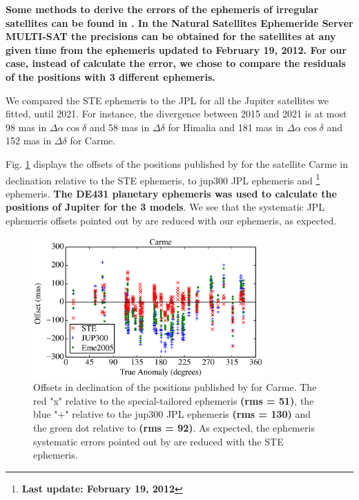 \documentclass[useAMS,usenatbib]{mn2e}
\begin{document}
\textbf{Some methods to derive the errors of the ephemeris of irregular satellites can be found in \cite{Emelyanov2010}. In the Natural Satellites Ephemeride Server MULTI-SAT \citep{Emelyanov2008} the precisions can be obtained for the satellites at any given time from the \cite{Emelyanov2005} ephemeris updated to February 19, 2012. For our case, instead of calculate the error, we chose to compare the residuals of the  positions with 3 different ephemeris.}

We compared the STE ephemeris to the JPL for all the Jupiter satellites we fitted, until 2021. For instance, the divergence between 2015 and 2021 is at most 98 mas in $\Delta \alpha \cos \delta$ and 58 mas in $\Delta \delta$ for Himalia and 181 mas in $\Delta \alpha \cos \delta$ and 152 mas in $\Delta \delta$ for Carme.

Fig. \ref{Fig: JPL-STE} displays the offsets of the positions published by  for the satellite Carme in declination relative to the STE ephemeris, to \cite{Jacobson2012} jup300 JPL ephemeris and \cite{Emelyanov2005}\footnote{\textbf{Last update: February 19, 2012}} ephemeris. \textbf{The DE431 planetary ephemeris \citep{Folkner2014} was used to calculate the positions of Jupiter for the 3 models}. We see that the systematic JPL ephemeris offsets pointed out by  are reduced with our ephemeris, as expected.

\begin{figure}
\includegraphics[width=8.8cm]{figures/Carme_ephemeris.eps}
\caption{Offsets in declination of the positions published by \protect{} for Carme. The red "x" relative to the special-tailored ephemeris \textbf{(rms = 51)}, the blue "+" relative to the jup300 JPL ephemeris \textbf{(rms = 130)} and the green dot relative to \protect\cite{Emelyanov2005} \textbf{(rms = 92)}. As expected, the ephemeris systematic errors pointed out by \protect{} are reduced with the STE ephemeris. \label{Fig: JPL-STE}}
\end{figure}
\end{document}
